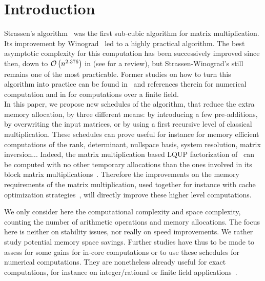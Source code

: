 \documentclass{article}
\begin{document}
\section{Introduction}
Strassen's algorithm~\cite{Strassen:1969:GENO} was the
first sub-cubic algorithm for matrix multiplication.
Its improvement by Winograd~\cite{Winograd:1971:tbtmm}
led to a highly practical algorithm.
The best asymptotic complexity for this computation has been
successively improved since then, down to $\mathcal{O}\left(n^{2.376}\right)$
in \cite{Coppersmith:1990:MMAP} (see
\cite{Bini:1994:PMC-FA,burgisser:1997} for a review), but
Strassen-Winograd's
still remains one of the most practicable.
Former studies on how to turn this algorithm into practice can be found
in~\cite{bailey:603,Huss-Lederman:1996:ISA, Huss-Lederman:1996:mai,
  Douglas:1994:gemmw}
and references therein for numerical computation and in
\cite{Pernet:2001:Winograd, Dumas:2002:FFLAS}
for computations over a finite field.\\
In this paper, we propose new schedules of the algorithm, that
reduce the
extra memory allocation, by three different means:
by introducing a few pre-additions, by overwriting the input matrices, or by using a first recursive level of classical multiplication.
These schedules can prove useful for instance for memory
efficient computations of the rank,
determinant, nullspace basis, system resolution, matrix inversion...
Indeed, the matrix multiplication based LQUP factorization of~\cite{Ibarra:1982:LSP} can be
computed with no other temporary allocations than the ones involved in
its block matrix
multiplications~\cite{JeannerodPernet:2007:LQUP}. Therefore the
improvements on
the memory requirements of the matrix multiplication, used together
for instance with cache optimization strategies~\cite{Bader:2006:comm}, will directly
improve these higher level computations.

We only consider here the computational complexity and space
complexity, counting the number of arithmetic operations and memory
allocations.
The focus here is neither on stability issues, nor really on speed
improvements. We rather study potential memory space savings.
Further studies have thus to be made to assess for some gains for
in-core computations or to use these schedules
for numerical computations.
They are nonetheless already useful for exact computations, for instance on
integer/rational or finite field
applications~\cite{Dumas:2004:FFPACK,Laderman:1992:PAA}. 
\end{document}

